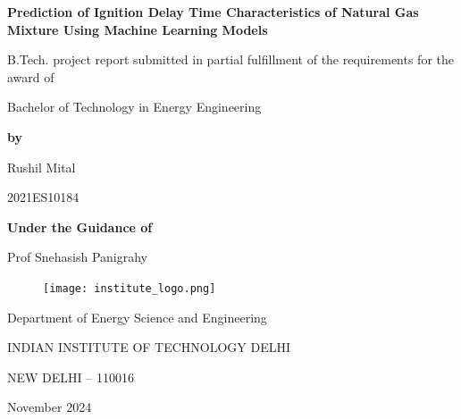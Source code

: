 \documentclass[12pt]{report}
\begin{document}
\begin{titlepage}
    \centering

    {\Huge \textbf{Prediction of Ignition Delay Time Characteristics of Natural Gas Mixture Using Machine Learning Models}\par}
    \vspace{1cm} %
    
    {\Large B.Tech. project report submitted in partial fulfillment of the requirements for the award of}\par
    
    {\Large Bachelor of Technology in Energy Engineering}\par
    
    \vspace{1cm}
    
    \textbf{by}\par
    {\Large Rushil Mital}\par
    \vspace{0.5cm}
    {\Large 2021ES10184}\par
    
    \vspace{0.5cm} %
    
    \textbf{Under the Guidance of}\par
    {\Large Prof Snehasish Panigrahy}\par
    
    \vspace{0.5cm} %

    \begin{figure}[H]
        \centering
        \texttt{[image: institute\_logo.png]} %
    \end{figure}
    
    {\Large Department of Energy Science and Engineering}\par
    \vspace{0.25cm}
    {\Large INDIAN INSTITUTE OF TECHNOLOGY DELHI}\par
    \vspace{0.25cm}
    {\Large NEW DELHI – 110016}\par
    {\Large November 2024}\par

\end{titlepage}
\end{document}
